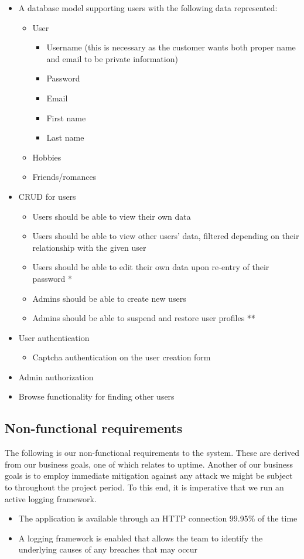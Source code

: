 \documentclass[a4paper]{article}
\begin{document}
\begin{itemize}
\item A database model supporting users with the following data represented:
  \begin{itemize}
  \item User
      \begin{itemize}
      \item Username (this is necessary as the customer wants both proper name and email to be private information)
      \item Password
      \item Email
      \item First name
      \item Last name
      \end{itemize}
  \item Hobbies
  \item Friends/romances
  \end{itemize}
\item CRUD for users
	\begin{itemize}
    \item Users should be able to view their own data
    \item Users should be able to view other users' data, filtered depending on their relationship with the given user
    \item Users should be able to edit their own data upon re-entry of their password *
    \item Admins should be able to create new users
    \item Admins should be able to suspend and restore user profiles **
    \end{itemize}
\item User authentication
	\begin{itemize}
	\item Captcha authentication on the user creation form
	\end{itemize}
\item Admin authorization
\item Browse functionality for finding other users
\end{itemize}

\subsection{Non-functional requirements}
The following is our non-functional requirements to the system. These are derived from our business goals, one of which relates to uptime. Another of our business goals is to employ immediate mitigation against any attack we might be subject to throughout the project period. To this end, it is imperative that we run an active logging framework.
\begin{itemize}
\item The application is available through an HTTP connection 99.95\% of the time
\item A logging framework is enabled that allows the team to identify the underlying causes of any breaches that may occur
\end{itemize}
\end{document}
